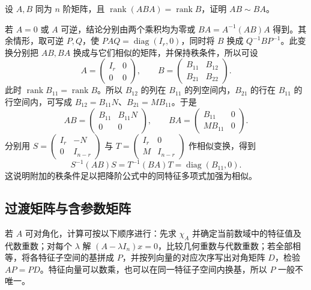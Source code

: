 \begin{example}
设 $A,B$ 同为 $n$ 阶矩阵，且 $\operatorname{rank}(ABA)=\operatorname{rank}B$，证明 $AB\sim BA$。
\end{example}
\begin{solve}
若 $A=0$ 或 $A$ 可逆，结论分别由两个乘积均为零或 $BA=A^{-1}(AB)A$ 得到。其余情形，取可逆 $P,Q$，使 $PAQ=\operatorname{diag}(I_r,0)$，同时将 $B$ 换成 $Q^{-1}BP^{-1}$。此变换分别把 $AB,BA$ 换成与它们相似的矩阵，并保持秩条件，所以可设
\[
A=\begin{pmatrix}I_r&0\\0&0\end{pmatrix},\qquad
B=\begin{pmatrix}B_{11}&B_{12}\\B_{21}&B_{22}\end{pmatrix}.
\]
此时 $\operatorname{rank}B_{11}=\operatorname{rank}B$。所以 $B_{12}$ 的列在 $B_{11}$ 的列空间内，$B_{21}$ 的行在 $B_{11}$ 的行空间内，可写成 $B_{12}=B_{11}N$、$B_{21}=MB_{11}$。于是
\[
AB=\begin{pmatrix}B_{11}&B_{11}N\\0&0\end{pmatrix},\qquad
BA=\begin{pmatrix}B_{11}&0\\MB_{11}&0\end{pmatrix}.
\]
分别用 $S=\begin{pmatrix}I_r&-N\\0&I_{n-r}\end{pmatrix}$ 与 $T=\begin{pmatrix}I_r&0\\M&I_{n-r}\end{pmatrix}$ 作相似变换，得到
\[
S^{-1}(AB)S=T^{-1}(BA)T=\operatorname{diag}(B_{11},0).
\]
这说明附加的秩条件足以把降阶公式中的同特征多项式加强为相似。
\end{solve}

\subsection{过渡矩阵与含参数矩阵}

若 $A$ 可对角化，计算可按以下顺序进行：先求 $\chi_A$ 并确定当前数域中的特征值及代数重数；对每个 $\lambda$ 解 $(A-\lambda I_n)x=0$，比较几何重数与代数重数；若全部相等，将各特征子空间的基拼成 $P$，并按列向量的对应次序写出对角矩阵 $D$，检验 $AP=PD$。特征向量可以数乘，也可以在同一特征子空间内换基，所以 $P$ 一般不唯一。

